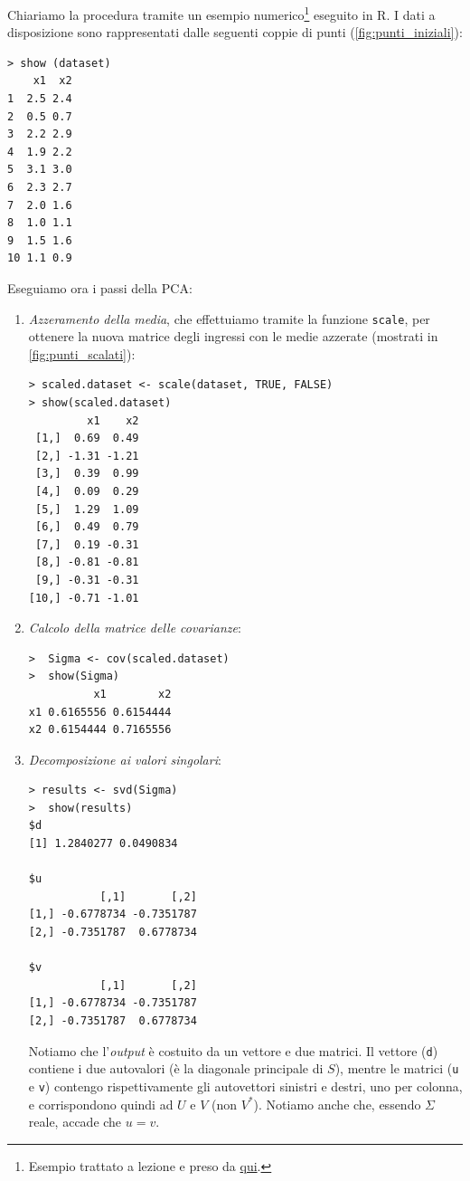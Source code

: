 \begin{esempio}
Chiariamo la procedura tramite un esempio numerico\footnote{Esempio trattato a lezione e preso da \href{http://www.cs.otago.ac.nz/cosc453/student_tutorials/principal_components.pdf}{qui}.} eseguito in R. I dati a disposizione sono rappresentati dalle seguenti coppie di punti (\autoref{fig:punti_iniziali}):
\begin{lstlisting}
> show (dataset)
    x1  x2
1  2.5 2.4
2  0.5 0.7
3  2.2 2.9
4  1.9 2.2
5  3.1 3.0
6  2.3 2.7
7  2.0 1.6
8  1.0 1.1
9  1.5 1.6
10 1.1 0.9
\end{lstlisting} 
Eseguiamo ora i passi della PCA:
\begin{enumerate}
\item \emph{Azzeramento della media}, che effettuiamo tramite la funzione \texttt{scale}, per ottenere la nuova matrice degli ingressi con le medie azzerate (mostrati in \autoref{fig:punti_scalati}):
\begin{lstlisting}
> scaled.dataset <- scale(dataset, TRUE, FALSE)
> show(scaled.dataset)
         x1    x2
 [1,]  0.69  0.49
 [2,] -1.31 -1.21
 [3,]  0.39  0.99
 [4,]  0.09  0.29
 [5,]  1.29  1.09
 [6,]  0.49  0.79
 [7,]  0.19 -0.31
 [8,] -0.81 -0.81
 [9,] -0.31 -0.31
[10,] -0.71 -1.01
\end{lstlisting}

\item \emph{Calcolo della matrice delle covarianze}:
\begin{lstlisting}
>  Sigma <- cov(scaled.dataset)
>  show(Sigma)
          x1        x2
x1 0.6165556 0.6154444
x2 0.6154444 0.7165556
\end{lstlisting}

\item \emph{Decomposizione ai valori singolari}:
 \begin{lstlisting}
> results <- svd(Sigma)
>  show(results)
$d
[1] 1.2840277 0.0490834

$u
           [,1]       [,2]
[1,] -0.6778734 -0.7351787
[2,] -0.7351787  0.6778734

$v
           [,1]       [,2]
[1,] -0.6778734 -0.7351787
[2,] -0.7351787  0.6778734
\end{lstlisting}

Notiamo che l'\emph{output} è costuito da un vettore e due matrici. Il vettore (\texttt{d}) contiene i due autovalori (è la diagonale principale di $S$), mentre le matrici (\texttt{u} e \texttt{v}) contengo rispettivamente gli autovettori sinistri e destri, uno per colonna, e corrispondono quindi ad $U$ e $V$ (non $V^*$). Notiamo anche che, essendo $\Sigma$ reale, accade che $u = v$.


\end{enumerate}
\end{esempio}
